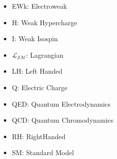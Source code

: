 \begin{itemize}
\item{EWk: Electroweak}
\item{H: Weak Hypercharge}
\item{ I: Weak Isospin}
\item{$\mathcal{L_{SM}}$: Lagrangian}
\item{LH:  Left Handed}
\item{Q: Electric Charge}
\item{QED: Quantum Electrodynamics}
\item{QCD: Quantum Chromodynamics}
\item{RH: RightHanded}
\item{SM: Standard Model}
\end{itemize}